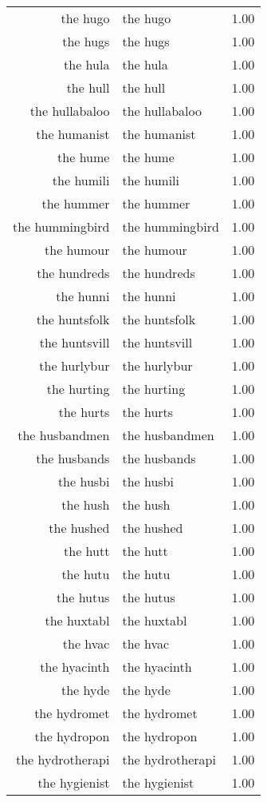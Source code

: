 \begin{table}[ht]
\begin{tabular}{rlr}
  the hugo & the hugo & 1.00 \\ 
  the hugs & the hugs & 1.00 \\ 
  the hula & the hula & 1.00 \\ 
  the hull & the hull & 1.00 \\ 
  the hullabaloo & the hullabaloo & 1.00 \\ 
  the humanist & the humanist & 1.00 \\ 
  the hume & the hume & 1.00 \\ 
  the humili & the humili & 1.00 \\ 
  the hummer & the hummer & 1.00 \\ 
  the hummingbird & the hummingbird & 1.00 \\ 
  the humour & the humour & 1.00 \\ 
  the hundreds & the hundreds & 1.00 \\ 
  the hunni & the hunni & 1.00 \\ 
  the huntsfolk & the huntsfolk & 1.00 \\ 
  the huntsvill & the huntsvill & 1.00 \\ 
  the hurlybur & the hurlybur & 1.00 \\ 
  the hurting & the hurting & 1.00 \\ 
  the hurts & the hurts & 1.00 \\ 
  the husbandmen & the husbandmen & 1.00 \\ 
  the husbands & the husbands & 1.00 \\ 
  the husbi & the husbi & 1.00 \\ 
  the hush & the hush & 1.00 \\ 
  the hushed & the hushed & 1.00 \\ 
  the hutt & the hutt & 1.00 \\ 
  the hutu & the hutu & 1.00 \\ 
  the hutus & the hutus & 1.00 \\ 
  the huxtabl & the huxtabl & 1.00 \\ 
  the hvac & the hvac & 1.00 \\ 
  the hyacinth & the hyacinth & 1.00 \\ 
  the hyde & the hyde & 1.00 \\ 
  the hydromet & the hydromet & 1.00 \\ 
  the hydropon & the hydropon & 1.00 \\ 
  the hydrotherapi & the hydrotherapi & 1.00 \\ 
  the hygienist & the hygienist & 1.00 \\ 

\end{tabular}
\end{table}
